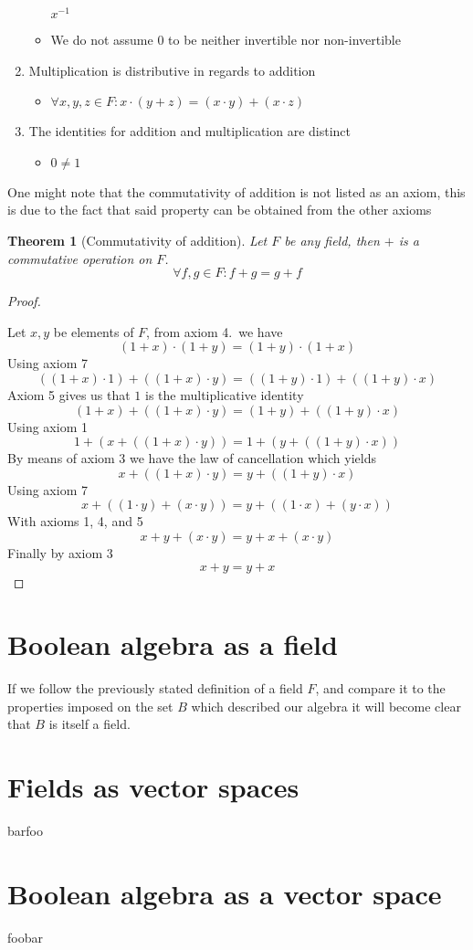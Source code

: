 \documentclass{article}
\newtheorem*{theorem}{Theorem}
\begin{document}
\begin{enumerate}
\begin{itemize}
	      	      $x^{-1}$
	      	\item We do not assume $0$ to be neither invertible nor non-invertible
	      \end{itemize}
	\item Multiplication is distributive in regards to addition
	      \begin{itemize}
	      	\item $\forall x,y,z \in F : x \cdot (y + z) = (x \cdot y) + (x \cdot z)$
	      \end{itemize}
	\item The identities for addition and multiplication are distinct
	      \begin{itemize}
	      	\item $0 \neq 1$
	      \end{itemize}
\end{enumerate}

One might note that the commutativity of addition is not listed as an axiom,
this is due to the fact that said property can be obtained from the other axioms

\begin{theorem}[Commutativity of addition]

	Let $F$ be any field, then $+$ is a commutative operation on $F$.
	$$\forall f,g \in F :  f + g = g + f$$
\end{theorem}
\begin{proof}\cite{addcomm}

	Let $x, y$ be elements of $F$, from axiom 4.\ we have
	$$(1+x)\cdot(1+y)=(1+y)\cdot(1+x)$$
	Using axiom 7
	$$((1+x)\cdot 1)+((1+x)\cdot y) = ((1+y)\cdot 1)+((1+y)\cdot x)$$
	Axiom 5 gives us that $1$ is the multiplicative identity
	$$(1+x)+((1+x)\cdot y) = (1+y)+((1+y)\cdot x)$$
	Using axiom 1
	$$1+(x+((1+x)\cdot y)) = 1+(y+((1+y)\cdot x))$$
	By means of axiom 3 we have the law of cancellation which yields
	$$x+((1+x)\cdot y) = y+((1+y)\cdot x)$$
	Using axiom 7
	$$x+((1\cdot y)+(x\cdot y)) = y+((1\cdot x)+(y\cdot x))$$
	With axioms 1, 4, and 5
	$$x+y+(x\cdot y) = y+x+(x\cdot y)$$
	Finally by axiom 3
	$$x+y=y+x$$
\end{proof}
\section{Boolean algebra as a field}
\label{sec:Boolean algebra as a field}

If we follow the previously stated definition of a field $F$, and compare it to
the properties imposed on the set $B$ which described our algebra it will become
clear that $B$ is itself a field.

\section{Fields as vector spaces}
\label{sec:Fields as vector spaces}

barfoo

\section{Boolean algebra as a vector space}
\label{sec:Boolean algebra as a vector space}

foobar

\newpage



\end{document}

